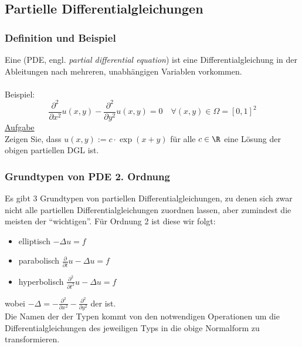 \subsection{Partielle Differentialgleichungen}
%
\begin{frame}\frametitle{Definition und Beispiel}
Eine  (PDE, engl. \textit{partial differential equation}) ist eine Differentialgleichung in der Ableitungen nach mehreren, unabhängigen Variablen vorkommen.\\\quad\\
Beispiel: 
$$
\frac{\partial^2}{\partial x^2} u(x,y) - \frac{\partial^2}{\partial y^2} u(x,y) =0 \quad \forall (x,y) \in \Omega = [0,1]^2
$$
\underline{Aufgabe}\\
Zeigen Sie, dass $u(x,y):=c\cdot \exp(x+y)$ für alle $c \in \R$ eine Lösung der obigen partiellen DGL ist.
\end{frame}
%
%
\begin{frame}\frametitle{Grundtypen von PDE 2. Ordnung}
Es gibt 3 Grundtypen von partiellen Differentialgleichungen, zu denen sich zwar nicht alle partiellen Differentialgleichungen zuordnen lassen, aber zumindest die meisten der ``wichtigen''. Für Ordnung 2 ist diese wir folgt:\\\quad

\begin{itemize}
	\item elliptisch \hspace{16mm}$-\Delta u = f$\\\quad	
	\item parabolisch \hspace{4.25mm}$\frac{\partial}{\partial t}u-\Delta u = f$\\\quad
	\item hyperbolisch  \hspace{1mm}$\frac{\partial^2}{\partial t^2}u-\Delta u = f$\\\quad
\end{itemize}
wobei $-\Delta = -\frac{\partial^2}{\partial x^2}-\frac{\partial^2}{\partial y^2}$ der  ist.\\
Die Namen der der Typen kommt von den notwendigen Operationen um die Differentialgleichungen des jeweiligen Typs in die obige Normalform zu transformieren.
\end{frame}
%
%

